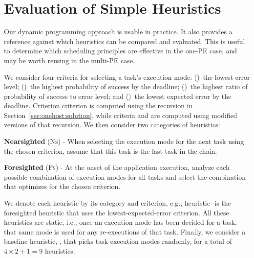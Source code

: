 %
%


\section{Evaluation of Simple Heuristics}
\label{sec:onehost:heuristics}

Our dynamic programming approach is usable in practice. It also
provides a reference against which heuristics can be compared and evaluated.
This is useful to determine which scheduling principles are effective in the 
one-PE case, and may be worth reusing in the multi-PE case.

We consider four criteria for selecting a task's execution mode:
(\errorlevel)~the lowest error level;
(\probsuccess)~the highest probability of success by the deadline; (\ratio)~the
highest ratio of probability of success to error level; and (\expectederror)~the
lowest expected error by the deadline. Criterion \expectederror criterion is computed using the recursion in Section~\ref{sec:onehost:solution}, while criteria \probsuccess and \ratio
are computed using modified versions of that recursion.  We then consider two categories of heuristics:
\begin{compactitem}	
	\item \textbf{Nearsighted} (\textsc{Ns}) - When selecting the execution mode for the next task using the chosen criterion, assume that this task is the last task in the chain. 
	\item \textbf{Foresighted} (\textsc{Fs}) - At the onset of the application execution, 
	analyze each possible combination of execution modes for all tasks and select 
	the combination that optimizes for the chosen criterion.
\end{compactitem}
\noindent
We denote each heuristic by its category and criterion, e.g., heuristic
\foresighted-\expectederror is the foresighted heuristic that uses the
lowest-expected-error criterion. All these heuristics are static, i.e.,
once an execution mode has been decided for a task, that same mode is used
for any re-executions of that task.  Finally, we consider a baseline
heuristic, \random, that picks task execution modes randomly,  for a total
of $4{\times}2{+}1{=}9$ heuristics.



